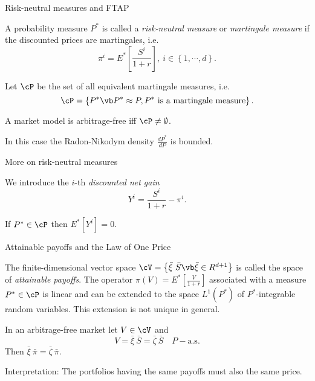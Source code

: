 \begin{frame}
    {Risk-neutral measures and FTAP}
    
    A probability measure $P^{*}$ is called a \emph{risk-neutral measure}
    or \emph{martingale measure} if the discounted prices are martingales, i.e.
    \begin{equation}
        \pi^{i} = E^{*} \left[ \frac{S^{i}}{1+r} \right], \ 
        i \in \left\{ 1,\cdots,d \right\}.
    \end{equation}

    Let $\cP$ be the set of all equivalent martingale measures, i.e.\ 
    \begin{equation}
        \cP = \left\{ P^{*} \vb P^{*} \approx P, 
        P^{*} \text{ is a martingale measure}  \right\}.
    \end{equation}

    \begin{theorem}
        A market model is arbitrage-free iff $\cP \neq \emptyset$. 

        In this case the Radon-Nikodym density $\frac{d P^*}{d P}$ is bounded. 
    \end{theorem}
\end{frame}


\begin{frame}
    {More on risk-neutral measures}
        
    We introduce the $i$-th \emph{discounted net gain} 
    \begin{equation}
        Y^i = \frac{S^i}{1+r} - \pi^{i}.
    \end{equation}

    If $P^{*} \in \cP$ then $E^* \left[ Y^i \right] =0$.

\end{frame}


\begin{frame}
    {Attainable payoffs and the Law of One Price} 
    
    The finite-dimensional vector space $\cV = \left\{ \bar{\xi} \ \bar{S} \vb
    \bar{\xi} \in R^{d+1} \right\}$ is called the space of \emph{attainable payoffs}.
    The operator $\pi (V) = E^{*} \left[ \frac{V}{1+r} \right]$ associated
    with a measure $P^* \in \cP$ is linear and can be extended to the space $L^1
    (P^*)$ of $P^*$-integrable random variables. This extension is not unique
    in general. 

    \begin{theorem}
        In an arbitrage-free market let $V\in \cV$ and
        \begin{equation}
            V = \bar{\xi} \ \bar{S} = \bar{\zeta} \ \bar{S} \quad P-\text{a.s.}
        \end{equation}
        Then $\bar{\xi} \ \bar{\pi} = \bar{\zeta} \ \bar{\pi}$.
    \end{theorem}

    Interpretation: The portfolios having the same payoffs must also the 
    same price. 
\end{frame}





